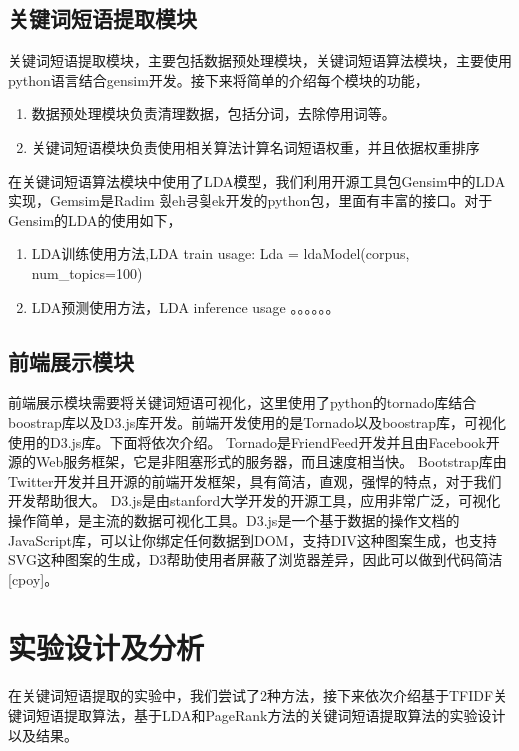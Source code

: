 \documentclass[master]{njuthesis}
\begin{document}
\subsection{关键词短语提取模块}
关键词短语提取模块，主要包括数据预处理模块，关键词短语算法模块，主要使用python语言结合gensim开发。接下来将简单的介绍每个模块的功能，
\begin{enumerate}
\item 数据预处理模块负责清理数据，包括分词，去除停用词等。
\item 关键词短语模块负责使用相关算法计算名词短语权重，并且依据权重排序
\end{enumerate}
在关键词短语算法模块中使用了LDA模型，我们利用开源工具包Gensim中的LDA实现，Gemsim是Radim 힀eh킁힂ek开发的python包，里面有丰富的接口。对于Gensim的LDA的使用如下，
\begin{enumerate}
\item LDA训练使用方法,LDA train usage: Lda = ldaModel(corpus, num\_topics=100)
\item LDA预测使用方法，LDA inference usage 。。。。。。
\end{enumerate}

\subsection{前端展示模块}
前端展示模块需要将关键词短语可视化，这里使用了python的tornado库结合boostrap库以及D3.js库开发。前端开发使用的是Tornado以及boostrap库，可视化使用的D3.js库。下面将依次介绍。
Tornado是FriendFeed开发并且由Facebook开源的Web服务框架，它是非阻塞形式的服务器，而且速度相当快。
Bootstrap库由Twitter开发并且开源的前端开发框架，具有简洁，直观，强悍的特点，对于我们开发帮助很大。
D3.js是由stanford大学开发的开源工具，应用非常广泛，可视化操作简单，是主流的数据可视化工具。D3.js是一个基于数据的操作文档的JavaScript库，可以让你绑定任何数据到DOM，支持DIV这种图案生成，也支持SVG这种图案的生成，D3帮助使用者屏蔽了浏览器差异，因此可以做到代码简洁[cpoy]。


\section{实验设计及分析}
在关键词短语提取的实验中，我们尝试了2种方法，接下来依次介绍基于TFIDF关键词短语提取算法，基于LDA和PageRank方法的关键词短语提取算法的实验设计以及结果。
\end{document}
